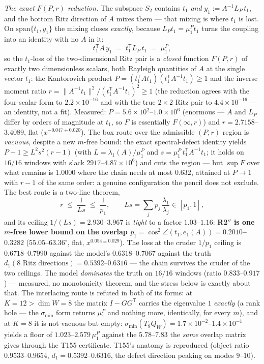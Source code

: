 \documentclass[11pt,a4paper]{article}
\begin{document}
\emph{The exact $F(P,r)$ reduction.} The subspace $S_2$ contains $t_1$ \emph{and}
$y_1:=A^{-1}L_P\,t_1$, and the bottom Ritz direction of $A$ mixes them --- that mixing is
where $t_1$ is lost. On $\mathrm{span}\{t_1,y_1\}$ the mixing closes \emph{exactly},
because $L_Pt_1=\mu^P_1t_1$ turns the coupling into an identity with no $A$ in it:
\[
t_1^{\mathsf T}A\,y_1 \;=\; t_1^{\mathsf T}L_P\,t_1 \;=\; \mu^P_1 ,
\]
so the $t_1$-loss of the two-dimensional Ritz pair is a \emph{closed} function $F(P,r)$
of exactly two dimensionless scalars, both Rayleigh quantities of $A$ at the single
vector $t_1$: the Kantorovich product
$P=(t_1^{\mathsf T}At_1)(t_1^{\mathsf T}A^{-1}t_1)\ge1$ and the inverse moment ratio
$r=\|A^{-1}t_1\|^2/(t_1^{\mathsf T}A^{-1}t_1)^2\ge1$ (the reduction agrees with the
four-scalar form to $2.2\times10^{-16}$ and with the true $2\times2$ Ritz pair to
$4.4\times10^{-16}$ --- an identity, not a fit). Measured: $P=5.6\times10^{2}$--$1.0
\times10^{6}$ (enormous --- $A$ and $L_P$ differ by orders of magnitude at $t_1$, so $F$
is essentially $F(\infty,r)$) and $r=2.7158$--$3.4089$, flat ($x^{-0.047\pm0.020}$). The
box route over the admissible $(P,r)$ region is \emph{vacuous}, despite a new $m$-free
bound: the exact spectral-defect identity yields $P-1\ge L^2s^2(r-1)$ (with
$L=\lambda_1(A)/\mu^P_1$ and $s=\mu^P_1\,t_1^{\mathsf T}A^{-1}t_1$; it holds on $16/16$
windows with slack $2917$--$4.87\times10^{6}$) and cuts the region --- but $\sup F$ over
what remains is $1.0000$ where the chain needs at most $0.632$, attained at $P\to1$ with
$r-1$ of the same order: a genuine configuration the pencil does not exclude. The best
route is a two-line theorem,
\[
r \;\le\; \frac{1}{Ls} \;\le\; \frac{1}{p_1},
\qquad
Ls=\sum_j p_j\,\frac{\lambda_1}{\lambda_j}\in[p_1,1],
\]
and its ceiling $1/(Ls)=2.930$--$3.967$ is \emph{tight} to a factor $1.03$--$1.16$:
\textbf{R2$''$ is one $m$-free lower bound on the overlap
$p_1=\cos^2\angle(t_1,e_1(A))=\mathbf{0.2010}$--$\mathbf{0.3282}$}
($55.05$--$63.36^\circ$, flat, $x^{0.054\pm0.029}$). The loss at the cruder $1/p_1$
ceiling is $0.6718$--$0.7990$ against the model's $0.6318$--$0.7067$ against the truth
$d_1(\text{8 Ritz directions})=0.5392$--$0.6316$ --- the chain survives the cruder of the
two ceilings. The model \emph{dominates} the truth on $16/16$ windows (ratio
$0.833$--$0.917$) --- measured, no monotonicity theorem, and the stress below is exactly
about that. The interlacing route is refuted in both of its forms: at $K=12>\dim W=8$ the
matrix $I-GG^{\mathsf T}$ carries the eigenvalue $1$ \emph{exactly} (a rank hole --- the
$\sigma_{\min}$ form returns $\mu^P_1$ and nothing more, identically, for every $m$), and
at $K=8$ it is not vacuous but empty: $\sigma_{\min}(T_8Q_W)=1.7\times10^{-2}$--$1.4
\times10^{-1}$ yields a floor of $1.023$--$2.579\,\mu^P_1$ against the $5.78$--$7.83$ the
\emph{same} overlap matrix gives through the T155 certificate. T155's anatomy is
reproduced (object ratio $0.9533$--$0.9654$, $d_1=0.5392$--$0.6316$, the defect direction
peaking on modes $9$--$10$).
\end{document}
